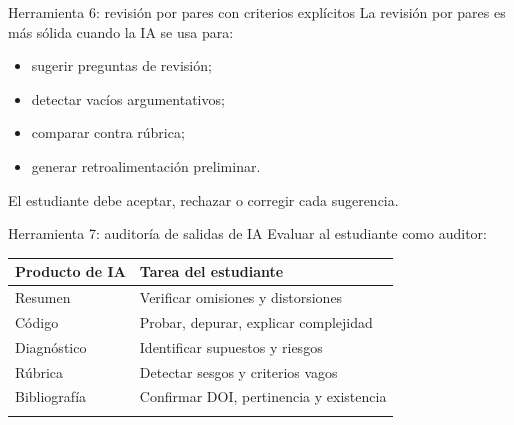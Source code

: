 \documentclass[
  ignorenonframetext,
  aspectratio=169,
  spanish,
]{beamer}
\newcounter{none} %
\providecommand{\tightlist}{%
  \setlength{\itemsep}{0pt}\setlength{\parskip}{0pt}}
\begin{document}
\begin{frame}{Herramienta 6: revisión por pares con criterios
explícitos}
\protect{}\label{herramienta-6-revisiuxf3n-por-pares-con-criterios-expluxedcitos}
La revisión por pares es más sólida cuando la IA se usa para:

\begin{itemize}
\tightlist
\item
  sugerir preguntas de revisión;
\item
  detectar vacíos argumentativos;
\item
  comparar contra rúbrica;
\item
  generar retroalimentación preliminar.
\end{itemize}

El estudiante debe aceptar, rechazar o corregir cada sugerencia.
\end{frame}

\begin{frame}{Herramienta 7: auditoría de salidas de IA}
\protect{}\label{herramienta-7-auditoruxeda-de-salidas-de-ia}
Evaluar al estudiante como auditor:

{\def\LTcaptype{none} %
\begin{longtable}[]{@{}ll@{}}
\toprule\noalign{}
Producto de IA & Tarea del estudiante \\
\midrule\noalign{}
\endhead
Resumen & Verificar omisiones y distorsiones \\
Código & Probar, depurar, explicar complejidad \\
Diagnóstico & Identificar supuestos y riesgos \\
Rúbrica & Detectar sesgos y criterios vagos \\
Bibliografía & Confirmar DOI, pertinencia y existencia \\
\bottomrule\noalign{}
\end{longtable}
}
\end{frame}
\end{document}
